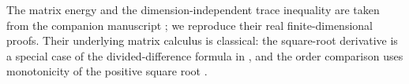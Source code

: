 The matrix energy and the dimension-independent trace inequality are
taken from the companion manuscript \cite[Sections~2--3, Lemmas~2.1,
2.2 and~3.1]{OpenAI2026}; we reproduce their real finite-dimensional
proofs. Their underlying matrix calculus is classical: the
square-root derivative is a special case of the divided-difference
formula in \cite[Section~1, Equation~(1)]{Daletskii1957}, and the order
comparison uses monotonicity of the positive square root
\cite[Theorem, p.~309]{Pedersen1972}.
